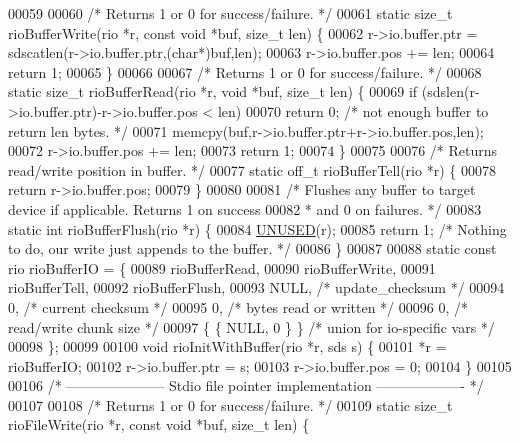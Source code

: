 \begin{DoxyCode}
00059 
00060 \textcolor{comment}{/* Returns 1 or 0 for success/failure. */}
00061 \textcolor{keyword}{static} size\_t rioBufferWrite(rio *r, \textcolor{keyword}{const} \textcolor{keywordtype}{void} *buf, size\_t len) \{
00062     r->io.buffer.ptr = sdscatlen(r->io.buffer.ptr,(\textcolor{keywordtype}{char}*)buf,len);
00063     r->io.buffer.pos += len;
00064     \textcolor{keywordflow}{return} 1;
00065 \}
00066 
00067 \textcolor{comment}{/* Returns 1 or 0 for success/failure. */}
00068 \textcolor{keyword}{static} size\_t rioBufferRead(rio *r, \textcolor{keywordtype}{void} *buf, size\_t len) \{
00069     \textcolor{keywordflow}{if} (sdslen(r->io.buffer.ptr)-r->io.buffer.pos < len)
00070         \textcolor{keywordflow}{return} 0; \textcolor{comment}{/* not enough buffer to return len bytes. */}
00071     memcpy(buf,r->io.buffer.ptr+r->io.buffer.pos,len);
00072     r->io.buffer.pos += len;
00073     \textcolor{keywordflow}{return} 1;
00074 \}
00075 
00076 \textcolor{comment}{/* Returns read/write position in buffer. */}
00077 \textcolor{keyword}{static} off\_t rioBufferTell(rio *r) \{
00078     \textcolor{keywordflow}{return} r->io.buffer.pos;
00079 \}
00080 
00081 \textcolor{comment}{/* Flushes any buffer to target device if applicable. Returns 1 on success}
00082 \textcolor{comment}{ * and 0 on failures. */}
00083 \textcolor{keyword}{static} \textcolor{keywordtype}{int} rioBufferFlush(rio *r) \{
00084     \hyperlink{server_8h_ae7c9dc8f13568a9c856573751f1ee1ec}{UNUSED}(r);
00085     \textcolor{keywordflow}{return} 1; \textcolor{comment}{/* Nothing to do, our write just appends to the buffer. */}
00086 \}
00087 
00088 \textcolor{keyword}{static} \textcolor{keyword}{const} rio rioBufferIO = \{
00089     rioBufferRead,
00090     rioBufferWrite,
00091     rioBufferTell,
00092     rioBufferFlush,
00093     NULL,           \textcolor{comment}{/* update\_checksum */}
00094     0,              \textcolor{comment}{/* current checksum */}
00095     0,              \textcolor{comment}{/* bytes read or written */}
00096     0,              \textcolor{comment}{/* read/write chunk size */}
00097     \{ \{ NULL, 0 \} \} \textcolor{comment}{/* union for io-specific vars */}
00098 \};
00099 
00100 \textcolor{keywordtype}{void} rioInitWithBuffer(rio *r, sds s) \{
00101     *r = rioBufferIO;
00102     r->io.buffer.ptr = s;
00103     r->io.buffer.pos = 0;
00104 \}
00105 
00106 \textcolor{comment}{/* --------------------- Stdio file pointer implementation ------------------- */}
00107 
00108 \textcolor{comment}{/* Returns 1 or 0 for success/failure. */}
00109 \textcolor{keyword}{static} size\_t rioFileWrite(rio *r, \textcolor{keyword}{const} \textcolor{keywordtype}{void} *buf, size\_t len) \{

\end{DoxyCode}
